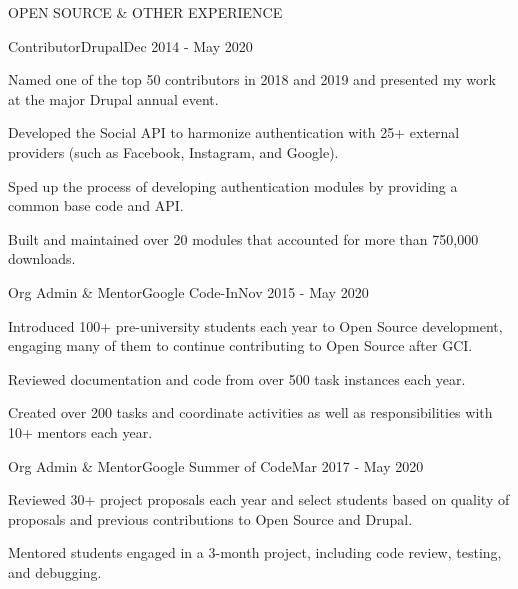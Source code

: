 \documentclass{resume} %
\begin{document}
\begin{rSection}{OPEN SOURCE \& OTHER EXPERIENCE}

\begin{rSubsection}{Contributor}{Drupal}{}{Dec 2014 - May 2020}
\item Named one of the top 50 contributors in 2018 and 2019 and presented my work at the major Drupal annual event.
\item Developed the Social API to harmonize authentication with 25+ external providers (such as Facebook, Instagram, and Google).
\item Sped up the process of developing authentication modules by providing a common base code and API.
\item Built and maintained over 20 modules that accounted for more than 750,000 downloads.
\end{rSubsection}


\begin{rSubsection}{Org Admin \& Mentor}{Google Code-In}{}{Nov 2015 - May 2020}
\item Introduced 100+ pre-university students each year to Open Source development, engaging many of them to continue contributing to Open Source after GCI.
\item Reviewed documentation and code from over 500 task instances each year.
\item Created over 200 tasks and coordinate activities as well as responsibilities with 10+ mentors each year.
\linebreak
\linebreak
\end{rSubsection}


\begin{rSubsection}{Org Admin \& Mentor}{Google Summer of Code}{}{Mar 2017 - May 2020}
\item Reviewed 30+ project proposals each year and select students based on quality of proposals and previous contributions to Open Source and Drupal.
\item Mentored students engaged in a 3-month project, including code review, testing, and debugging.
\end{rSubsection}

\end{rSection}

\end{document}
